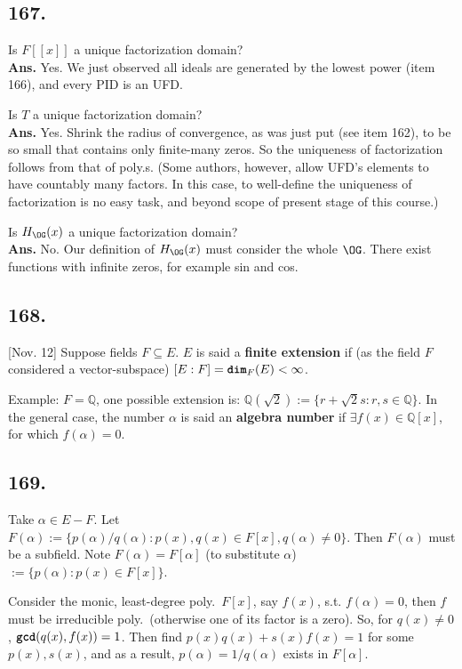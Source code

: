 \documentclass[12pt]{article}
\newcommand\aG\alpha \newcommand\bG\beta  \newcommand\gG\gamma \newcommand\dG\delta \newcommand\eG\varepsilon \newcommand\zG\zeta \newcommand\tG\vartheta \newcommand\kG\kappa \newcommand\lG\lambda \newcommand\sG\sigma \newcommand\fG\varphi \newcommand\oG\omega
\newcommand\oo\infty%
\newcommand\R\sqrt%
\newcommand\Ex\exists%
\newcommand{\BF}[1]{ \mathbb{#1} }%
\newcommand{\Ss}[1]{\textsf{\bfseries{#1}}}%
\newcommand{\Tw}[1]{\texttt{\bfseries{#1}}}%
\newcommand{\Nl}{\\ \indent} %
\begin{document}
\subsection*{167.} Is \(F[[x]]\) a unique factorization domain? \Nl
\Ss{Ans.} Yes. We just observed all ideals are generated by the lowest power (item 166), and every PID is an UFD. \par
Is \(T\) a unique factorization domain? \Nl
\Ss{Ans.} Yes. 
Shrink the radius of convergence, as was just put (see item 162), to be so small that contains only finite-many zeros. 
So the uniqueness of factorization follows from that of poly.s. 
(Some authors, however, allow UFD's elements to have countably many factors. In this case, to well-define the uniqueness of factorization is no easy task, and beyond scope of present stage of this course.) \par
Is \(H_\OG(x)\) a unique factorization domain? \Nl
\Ss{Ans.} No. 
Our definition of \(H_\OG(x)\) must consider the whole \(\OG\). 
There exist functions with infinite zeros, for example sin and cos. 

\subsection*{168.} [Nov. 12] Suppose fields \(F \subseteq E\). 
\(E\) is said a \Ss{finite extension} if (as the field \(F\) considered a vector-subspace) \([E:F] =\Tw{dim}_{F}(E) <\oo\). \par
Example: \(F = \BF{Q}\), one possible extension is: \(\BF{Q}(\R{2}) := \{r+\R{2}s: r,s \in \BF{Q}\}\). 
In the general case, the number \(\aG\) is said an \Ss{algebra number} if \(\Ex f(x) \in \BF{Q}[x]\), for which \(f(\aG) =0\). 

\subsection*{169.} Take \(\aG \in E-F\). Let \(F(\aG) := \{p(\aG)/q(\aG): p(x),q(x) \in F[x], q(\aG) \neq 0\}\). 
Then \(F(\aG)\) must be a subfield. 
Note \(F(\aG) = F[\aG]\) (to substitute \(\aG\)) \(:= \{p(\aG): p(x) \in F[x]\}\). \par
Consider the monic, least-degree poly.\ \(F[x]\), say \(f(x)\), s.t. \(f(\aG) =0\), then \(f\) must be irreducible poly.\ (otherwise one of its factor is a zero). 
So, for \(q(x) \neq 0\), \(\Tw{gcd}(q(x),f(x)) =1\). 
Then find \(p(x)q(x) +s(x)f(x) =1\) for some \(p(x), s(x)\), 
and as a result, \(p(\aG) = 1/q(\aG)\) exists in \(F[\aG]\). 
\end{document}
